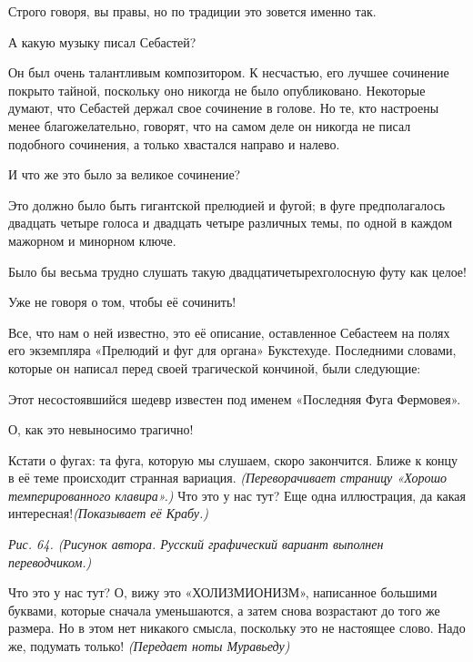 \documentclass[../main.tex]{subfiles}
\begin{document}
\begin{dialogue}
 Строго говоря, вы правы, но по традиции это зовется именно так.

 А какую музыку писал Себастей?

 Он был очень талантливым композитором. К несчастью, его лучшее сочинение покрыто тайной, поскольку оно никогда не было опубликовано. Некоторые думают, что Себастей держал свое сочинение в голове. Но те, кто настроены менее благожелательно, говорят, что на самом деле он никогда не писал подобного сочинения, а только хвастался направо и налево.

 И что же это было за великое сочинение?

 Это должно было быть гигантской прелюдией и фугой; в фуге предполагалось двадцать четыре голоса и двадцать четыре различных темы, по одной в каждом мажорном и минорном ключе.

 Было бы весьма трудно слушать такую двадцатичетырехголосную футу как целое!

 Уже не говоря о том, чтобы её сочинить!

 Все, что нам о ней известно, это её описание, оставленное Себастеем на полях его экземпляра «Прелюдий и фуг для органа» Букстехуде. Последними словами, которые он написал перед своей трагической кончиной, были следующие:


Этот несостоявшийся шедевр известен под именем «Последняя Фуга Фермовея».

 О, как это невыносимо трагично!

 Кстати о фугах: та фуга, которую мы слушаем, скоро закончится. Ближе к концу в её теме происходит странная вариация. \emph{(Переворачивает страницу «Хорошо темперированного клавира».)} Что это у нас тут? Еще одна иллюстрация, да какая интересная!\emph{(Показывает её Крабу.)}

\emph{Рис. 64. (Рисунок автора. Русский графический вариант выполнен переводчиком.)}

 Что это у нас тут? О, вижу это «ХОЛИЗМИОНИЗМ», написанное большими буквами, которые сначала уменьшаются, а затем снова возрастают до того же размера. Но в этом нет никакого смысла, поскольку это не настоящее слово. Надо же, подумать только! \emph{(Передает ноты Муравьеду)}


\end{dialogue}
\end{document}
